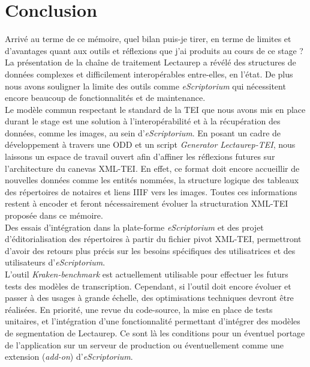 \part*{Conclusion}

Arrivé au terme de ce mémoire, quel bilan puis-je tirer, en terme de limites et d'avantages quant aux outils et réflexions que j'ai produits au cours de ce stage ?\\

La présentation de la chaîne de traitement Lectaurep a révélé des structures de données complexes et difficilement interopérables entre-elles, en l'état. De plus nous avons souligner la limite des outils comme \textit{eScriptorium} qui nécessitent encore beaucoup de fonctionnalités et de maintenance.\\

Le modèle commun respectant le standard de la TEI que nous avons mis en place durant le stage est une solution à l'interopérabilité et à la récupération des données, comme les images, au sein d'\textit{eScriptorium}. En posant un cadre de développement à travers une ODD et un script \textit{Generator Lectaurep-TEI}, nous laissons un espace de travail ouvert afin d'affiner les réflexions futures sur l'architecture du canevas XML-TEI. En effet, ce format doit encore accueillir de nouvelles données comme les entités nommées, la structure logique des tableaux des répertoires de notaires et liens IIIF vers les images. Toutes ces informations restent à encoder et feront nécessairement évoluer la structuration XML-TEI proposée dans ce mémoire.\\

Des essais d'intégration dans la plate-forme \textit{eScriptorium} et des projet d'éditorialisation des répertoires à partir du fichier pivot XML-TEI, permettront d'avoir des retours plus précis sur les besoins spécifiques des utilisatrices et des utilisateurs d'\textit{eScriptorium}.\\

L'outil \textit{Kraken-benchmark} est actuellement utilisable pour effectuer les futurs tests des modèles de transcription. Cependant, si l'outil doit encore évoluer et passer à des usages à grande échelle, des optimisations techniques devront être réalisées. En priorité, une revue du code-source, la mise en place de tests unitaires, et l'intégration d'une fonctionnalité permettant d'intégrer des modèles de segmentation de Lectaurep. Ce sont là les conditions pour un éventuel portage de l'application sur un serveur de production ou éventuellement comme une extension (\textit{add-on}) d'\textit{eScriptorium}.\\

